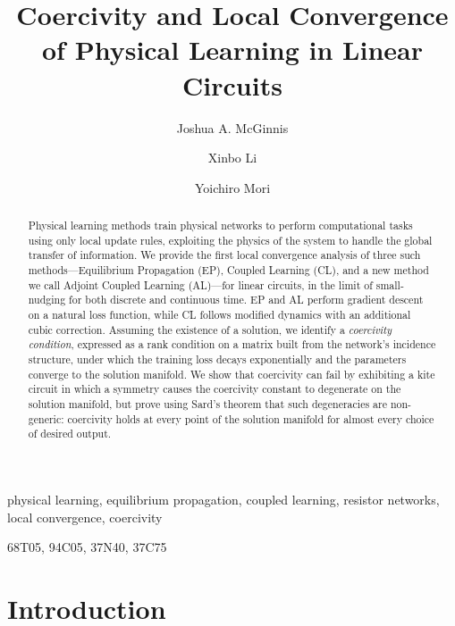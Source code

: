 \documentclass{siamart}
\title{Coercivity and Local Convergence of Physical Learning in Linear Circuits}
\author{Joshua A. McGinnis\footnotemark[1]
\and Xinbo Li\footnotemark[2]
\and Yoichiro Mori\footnotemark[2]\footnotemark[3]}
\begin{document}
\maketitle

\renewcommand{\thefootnote}{\fnsymbol{footnote}}

\begin{abstract}
Physical learning methods train physical networks to perform computational tasks using only local update rules, exploiting the physics of the system to handle the global transfer of information. We provide the first local convergence analysis of three such methods---Equilibrium Propagation (EP), Coupled Learning (CL), and a new method we call Adjoint Coupled Learning (AL)---for linear circuits, in the limit of small-nudging for both discrete and continuous time. EP and AL perform gradient descent on a natural loss function, while CL follows modified dynamics with an additional cubic correction. Assuming the existence of a solution, we identify a \emph{coercivity condition}, expressed as a rank condition on a matrix built from the network's incidence structure, under which the training loss decays exponentially and the parameters converge to the solution manifold. We show that coercivity can fail by exhibiting a kite circuit in which a symmetry causes the coercivity constant to degenerate on the solution manifold, but prove using Sard's theorem that such degeneracies are non-generic: coercivity holds at every point of the solution manifold for almost every choice of desired output.
\end{abstract}

\begin{keywords}
physical learning, equilibrium propagation, coupled learning, resistor networks, local convergence, coercivity
\end{keywords}

\begin{AMS}
68T05, 94C05, 37N40, 37C75
\end{AMS}

\section{Introduction}
\end{document}
